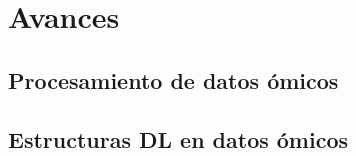 \section{Avances}

\subsection{Procesamiento de datos ómicos}

\subsection{Estructuras DL en datos ómicos}